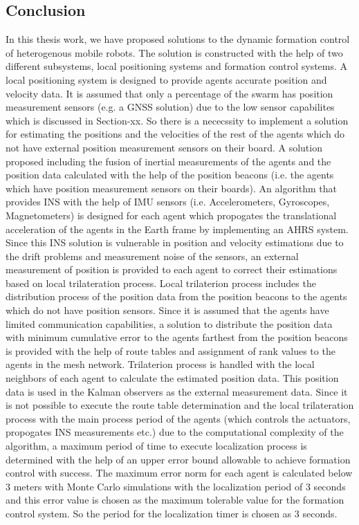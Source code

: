 \documentclass[twoside]{article}
\begin{document}
		\subsection{Conclusion}
		In this thesis work, we have proposed solutions to the dynamic formation control of heterogenous mobile robots. The solution is constructed with the help of two different subsystems, local positioning systems and formation control systems. 
       A	local positioning system is designed to provide agents accurate position and velocity data. It is assumed that only a percentage of the swarm has position measurement sensors (e.g. a GNSS solution) due to the low sensor capabilites which is discussed in Section-xx. So there is a nececssity to implement a solution for estimating the positions and the velocities of the rest of the agents which do not have external position measurement sensors on their board.  A solution proposed including the fusion of inertial measurements of the agents and the position data calculated with the help of the position beacons (i.e. the agents which have position measurement sensors on their boards). An algorithm that provides INS with the help of IMU sensors (i.e. Accelerometers, Gyroscopes, Magnetometers) is designed for each agent which propogates the translational acceleration of the agents in the Earth frame by implementing an AHRS system. Since this INS solution is vulnerable in position and velocity estimations due to the drift problems and measurement noise of the sensors, an external measurement of position is provided to each agent to correct their estimations based on local trilateration process. Local trilaterion process includes the distribution process of the position data from the position beacons to the agents which do not have position sensors. Since it is assumed that the agents have limited communication capabilities, a solution to distribute the position data with minimum cumulative error to the agents farthest from the position beacons is provided with the help of route tables and assignment of rank values to the agents in the mesh network. Trilaterion process is handled with the local neighbors of each agent to calculate the estimated position data. This position data is used in the Kalman observers as the external measurement data. Since it is not possible to execute the route table determination and the local trilateration process with the main process period of the agents (which controls the actuators, propogates INS measurements etc.) due to the computational complexity of the algorithm, a maximum period of time to execute localization process is determined with the help of an upper error bound allowable to achieve formation control with success. The maximum error norm for each agent is calculated below 3 meters with Monte Carlo simulations with the localization period of 3 seconds and this error value is chosen as the maximum tolerable value for the formation control system. So the period for the localization timer is chosen as 3 seconds.
       
\end{document}
